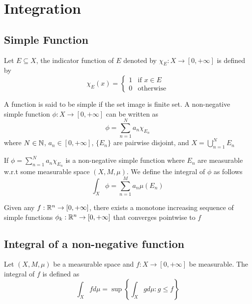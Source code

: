 \documentclass{report}
\begin{document}
\chapter{Integration}

\section{Simple Function}
\begin{definition}
    Let $E \subseteq X$, the indicator function of $E$ denoted by $\chi_{E}: X \to [0, +\infty]$ is defined by
    \[
        \chi_E(x) = \begin{cases}
            1 &\text{if $x \in E$} \\
            0 &\text{otherwise}
        \end{cases}
    \]
\end{definition}

\begin{definition}
    A function is said to be simple if the set image is finite set. A non-negative simple function $\phi: X \to [0, +\infty]$ can be written as
    \[
        \phi = \sum_{n=1}^N a_n \chi_{E_n}
    \]
    where $N \in \mathbb{N}$, $a_n \in [0, +\infty]$, $\{ E_n \}$ are pairwise disjoint, and $X = \bigcup_{n=1}^N E_n$
\end{definition}

\begin{definition}
    If $\phi = \sum_{n=1}^N a_n \chi_{E_n}$ is a non-negative simple function where $E_n$ are measurable w.r.t some measurable space $(X, M, \mu)$. We define the integral of $\phi$ as follows
    \[
        \int_X \phi = \sum_{n=1}^M a_n \mu(E_n)
    \]
\end{definition}

\begin{theorem}
    Given any $f: \mathbb{R}^n \to [0, +\infty]$, there exists a monotone increasing sequence of simple functions $\phi_k: \mathbb{R}^n \to [0, +\infty]$ that converges pointwise to $f$
\end{theorem}


\section{Integral of a non-negative function}
\begin{definition}
    Let $(X, M, \mu)$ be a measurable space and $f: X \to [0, +\infty]$ be measurable. The integral of $f$ is defined as
    \[
        \int_{X} f d\mu = \sup \left\{ \int_{X} g d\mu : g \leq f \right\}
    \]
\end{definition}
\end{document}
